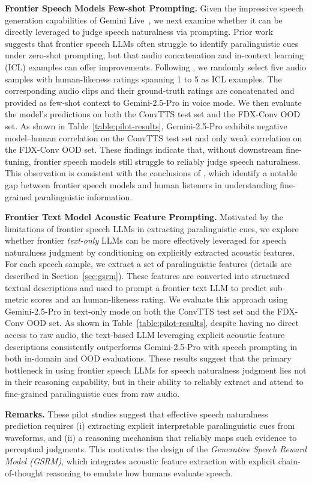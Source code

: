\textbf{Frontier Speech Models Few-shot Prompting.}
Given the impressive speech generation capabilities of Gemini Live~\cite{comanici2025gemini}, we next examine whether it can be directly leveraged to judge speech naturalness via prompting. Prior work~\cite{manakul2025audiojudge} suggests that frontier speech LLMs often struggle to identify paralinguistic cues under zero-shot prompting, but that audio concatenation and in-context learning (ICL) examples can offer improvements. Following \citet{manakul2025audiojudge}, we randomly select five audio samples with human-likeness ratings spanning 1 to 5 as ICL examples. The corresponding audio clips and their ground-truth ratings are concatenated and provided as few-shot context to Gemini-2.5-Pro in voice mode. We then evaluate the model’s predictions on both the ConvTTS test set and the FDX-Conv OOD set. As shown in Table~\ref{table:pilot-results}, Gemini-2.5-Pro exhibits negative model–human correlation on the ConvTTS test set and only weak correlation on the FDX-Conv OOD set. These findings indicate that, without downstream fine-tuning, frontier speech models still struggle to reliably judge speech naturalness. This observation is consistent with the conclusions of \citet{manakul2025audiojudge}, which identify a notable gap between frontier speech models and human listeners in understanding fine-grained paralinguistic information.

\textbf{Frontier Text Model Acoustic Feature Prompting.}
Motivated by the limitations of frontier speech LLMs in extracting paralinguistic cues, we explore whether frontier \emph{text-only} LLMs can be more effectively leveraged for speech naturalness judgment by conditioning on explicitly extracted acoustic features. For each speech sample, we extract a set of paralinguistic features (details are described in Section~\ref{sec:gsrm}). These features are converted into structured textual descriptions and used to prompt a frontier text LLM to predict sub-metric scores and an human-likeness rating. We evaluate this approach using Gemini-2.5-Pro in text-only mode on both the ConvTTS test set and the FDX-Conv OOD set. As shown in Table~\ref{table:pilot-results}, despite having no direct access to raw audio, the text-based LLM leveraging explicit acoustic feature descriptions consistently outperforms Gemini-2.5-Pro with speech prompting in both in-domain and OOD evaluations. These results suggest that the primary bottleneck in using frontier speech LLMs for speech naturalness judgment lies not in their reasoning capability, but in their ability to reliably extract and attend to fine-grained paralinguistic cues from raw audio. 

\textbf{Remarks.}
These pilot studies suggest that effective speech naturalness prediction requires (i) extracting explicit interpretable paralinguistic cues from waveforms, and (ii) a reasoning mechanism that reliably maps such evidence to perceptual judgments. This motivates the design of the \emph{Generative Speech Reward Model (GSRM)}, which integrates acoustic feature extraction with explicit chain-of-thought reasoning to emulate how humans evaluate speech.
\vspace{-1em}
